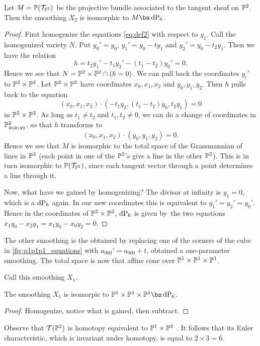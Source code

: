 \begin{lemma}
Let $M=\P(\mathcal T_ {\P^2})$ be the projective bundle associated to the tangent sheaf on $\P^2$. Then the smoothing $X_2$ is isomorphic to $M \bs \dP6$. 
\end{lemma}
\begin{proof}
First homogenize the equations \eqref{eq:def2} with respect to $y_1$. Call the homogenized variety $N$. Put $y_0'=y_0$, $y_1' = y_0-ty_1$ and $y_2'=y_0-t_2y_1$. Then we have the relation
\[
h = t_2y_1'-t_1y_2' - (t_1-t_2)y_0' = 0.
\]
Hence we see that $N=\P^2 \times \P^2 \cap (h = 0)$. We can pull back the coordinates $y_i'$ to $\P^2 \times \P^2$. Let $\P^2 \times \P^2$ have coordinates $x_0,x_1,x_2$ and $y_0,y_1,y_2$. Then $h$ pulls back to the equation
\[
(x_0,x_1,x_2) \cdot (-t_1y_2, (t_1-t_2)y_0,t_2y_1) = 0
\]
in $\P^2 \times \P^2$. As long as $t_1 \neq t_2$ and $t_1,t_2 \neq 0$, we can do a change of coordinates in $\P^2_{y_0y_1y_2}$, so that $h$ transforms to
\[
(x_0,x_1,x_2) \cdot(y_0,y_1,y_2) = 0.
\]
Hence we see that $M$ is isomorphic to the total space of the Grassmannian of lines in $\P^2$ (each point in one of the $\P^2$'s give a line in the other $\P^2$). This is in turn isomorphic to $\P(\mathcal T_{\P^2})$, since each tangent vector through a point determines a line through it.

Now, what have we gained by homogenizing? The divisor at infinity is $y_1=0$, which is a $\dP6$ again. In our new coordinates this is equivalent to $y_1'=y_2'=y_0'$. Hence in the coordinates of $\P^2 \times \P^2$, $\dP6$ is given by the two equations $x_1y_0-x_2y_1=x_1y_0-x_0y_2=0$. 
\end{proof}

The other smoothing is the obtained by replacing one of the corners of the cube in \cref{fig:p1p1p1_equations} with $a_{000}'=a_{000}+t$, obtained a one-parameter smoothing. The total space is now that affine cone over $\P^1 \times \P^1 \times \P^1$. 

Call this smoothing $X_1.$

\begin{lemma}
The smoothing $X_1$ is isomorpic to $\P^1 \times \P^1 \times \P^1 \bs \dP6$.
\end{lemma}
\begin{proof}
Homogenize, notice what is gained, then subtract.
\end{proof}

Observe that $\mathcal T(\P^2)$ is homotopy equivalent to $\P^1 \times \P^2$ . It follows that its Euler characteristic, which is invariant under homotopy, is equal to $2 \times 3=6$.


